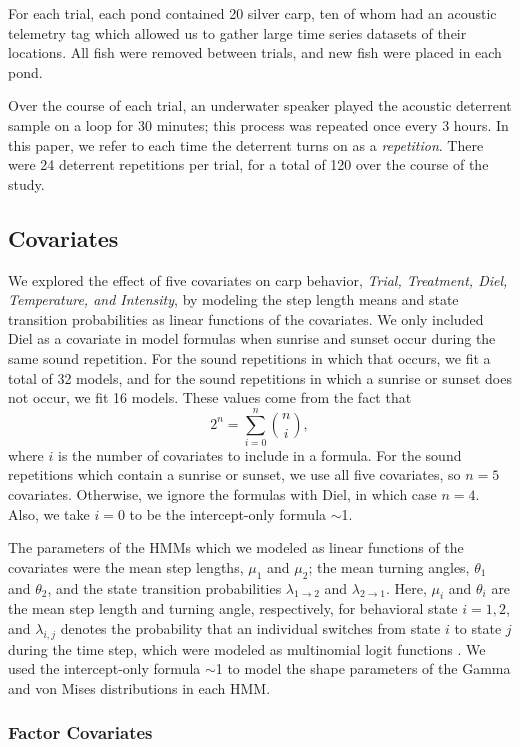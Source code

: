 \documentclass[12pt]{article}
\begin{document}
	For each trial, each pond contained 20 silver carp, ten of whom had an acoustic telemetry tag which allowed us to gather large time series datasets of their locations. All fish were removed between trials, and new fish were placed in each pond.
	
	Over the course of each trial, an underwater speaker played the acoustic deterrent sample on a loop for 30 minutes; this process was repeated once every 3 hours. In this paper, we refer to each time the deterrent turns on as a \emph{repetition}. There were 24 deterrent repetitions per trial, for a total of 120 over the course of the study.
	
	\subsection{Covariates}
	
	We explored the effect of five covariates on carp behavior, \emph{Trial, Treatment, Diel, Temperature, and Intensity}, by modeling the step length means and state transition probabilities as linear functions of the covariates. We only included Diel as a covariate in model formulas when sunrise and sunset occur during the same sound repetition. For the sound repetitions in which that occurs, we fit a total of 32 models, and for the sound repetitions in which a sunrise or sunset does not occur, we fit 16 models. These values come from the fact that
	\[2^n = \sum_{i=0}^n {n \choose i},\]
	where $i$ is the number of covariates to include in a formula. For the sound repetitions which contain a sunrise or sunset, we use all five covariates, so $n = 5$ covariates. Otherwise, we ignore the formulas with Diel, in which case $n = 4$. Also, we take $i = 0$ to be the intercept-only formula $\sim$1.
	
	The parameters of the HMMs which we modeled as linear functions of the covariates were the mean step lengths, $\mu_1$ and $\mu_2$; the mean turning angles, $\theta_1$ and $\theta_2$, and the state transition probabilities $\lambda_{1 \to 2}$ and $\lambda_{2 \to 1}$. Here, $\mu_i$ and $\theta_i$ are the mean step length and turning angle, respectively, for behavioral state $i = 1, 2$, and $\lambda_{i, j}$ denotes the probability that an individual switches from state $i$ to state $j$ during the time step, which were modeled as multinomial logit functions \cite{Michelot2016}. We used the intercept-only formula $\sim$1 to model the shape parameters of the Gamma and von Mises distributions in each HMM.
	
	\subsubsection{Factor Covariates}
	
\end{document}
